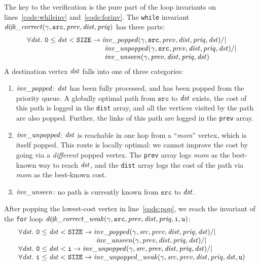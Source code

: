 The key to the verification is the pure part of the loop
invariants on lines~\ref{code:whileinv} and~\ref{code:forinv}.  The \texttt{while} invariant $\mathit{dijk\_correct}(\gamma, \texttt{src}, \mathit{prev}, \mathit{dist}, \mathit{priq})$ has three parts:
\[
\begin{array}{l}
\forall \m{dst}.~\texttt{0} \le \m{dst} < \texttt{SIZE} -> \m{inv\_popped}(\gamma, \texttt{src}, \m{prev}, \m{dist}, \m{priq}, \m{dst}) /| \null \\
\hspace{11em}\m{inv\_unpopped}(\gamma, \texttt{src}, \m{prev}, \m{dist}, \m{priq}, \m{dst}) /| \null \\
\hspace{11em}\m{inv\_unseen}(\gamma, \m{prev}, \m{dist}, \m{priq}, \m{dst})
\end{array}
\]
A destination vertex $\mathit{dst}$ falls into one of three
categories:
\begin{enumerate}
\item $\mathit{inv\_popped}$: $\mathit{dst}$ has been fully processed, and has been
popped from the priority queue.
A globally optimal path from $\texttt{src}$
to $\mathit{dst}$ exists, the cost of this path is logged in
the \texttt{dist} array, and all the vertices visited by the path are also popped.
Further, the links of this path are logged in the \texttt{prev} array.
\item $\mathit{inv\_unpopped}$: $\mathit{dst}$ is reachable in
one hop from a ``\emph{mom}'' vertex, which is itself popped.
This route is locally optimal: we cannot
improve the cost by going via a \emph{different} popped vertex.
The \texttt{prev} array logs
\emph{mom} as the best-known way to reach $\mathit{dst}$, and the \texttt{dist}
array logs the cost of the path via \emph{mom} as the best-known cost.
\item $\mathit{inv\_unseen}$: no path is currently known from $\texttt{src}$ to $\mathit{dst}$.
\end{enumerate}
After popping the lowest-cost vertex in line~\ref{code:pop}, we reach the invariant of
the \texttt{for} loop $\mathit{dijk\_correct\_weak}(\gamma, \texttt{src}, \mathit{prev}, \mathit{dist}, \mathit{priq}, \texttt{i}, \texttt{u})$:
\[
\begin{array}{l}
\forall \m{dst}.~\texttt{0} \le \m{dst} < \texttt{SIZE} -> \m{inv\_popped}(\gamma, \m{src}, \m{prev}, \m{dist}, \m{priq}, \m{dst}) /| \null \\
\hspace{11em}\m{inv\_unseen}(\gamma, \m{prev}, \m{dist}, \m{priq}, \m{dst}) /| \null \\
\forall \m{dst}.~\texttt{0} \le \m{dst} < \texttt{i} -> \m{inv\_unpopped}(\gamma, \m{src}, \m{prev}, \m{dist}, \m{priq}, \m{dst}) /| \null \\
\forall \m{dst}.~\texttt{i} \le \m{dst} < \texttt{SIZE} -> \m{inv\_unpopped\_weak}(\gamma, \m{src}, \m{prev}, \m{dist}, \m{priq}, \m{dst}, \texttt{u})
\end{array}
\]
